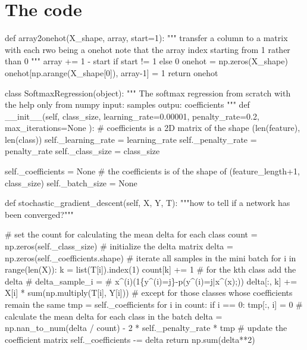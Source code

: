 \documentclass[a4paper]{article}
\begin{document}
\appendix
\section{The code}
\begin{python}

def array2onehot(X_shape, array, start=1):
    """
    transfer a column to a matrix with each rwo being a onehot
    note that the array index starting from 1 rather than 0
    """
    array += 1 - start if start != 1 else 0
    onehot = np.zeros(X_shape)
    onehot[np.arange(X_shape[0]), array-1] = 1
    return onehot


class SoftmaxRegression(object):
    """
    The softmax regression from scratch with the help only from numpy
    input:
        samples
    outpu:
        coefficients
    """
    def __init__(self,
                 class_size,
                 learning_rate=0.00001,
                 penalty_rate=0.2,
                 max_iterations=None
                 ):
        # coefficients is a 2D matrix of the shape (len(feature), len(class))
        self._learning_rate = learning_rate
        self._penalty_rate = penalty_rate
        self._class_size = class_size

        self._coefficients = None
				# the coefficients is of the shape of (feature_length+1, class_size)
        self._batch_size = None

    def stochastic_gradient_descent(self, X, Y, T):
        """how to tell if a network has been converged?"""

        # set the count for calculating the mean delta for each class
        count = np.zeros(self._class_size)
        # initialize the delta matrix
        delta = np.zeros(self._coefficients.shape)
        # iterate all samples in the mini batch
        for i in range(len(X)):
            k = list(T[i]).index(1)
            count[k] += 1
            # for the kth class add the delta
            # delta_{sample_i} =
            # x^{(i)}(1\{y^{(i)}=j\}-p(y^{(i)}=j|x^{(x)};\theta))
            delta[:, k] += X[i] * sum(np.multiply(T[i], Y[i]))
        # except for those classes whose coefficients remain the same
        tmp = self._coefficients
        for i in count:
            if i == 0:
                tmp[:, i] = 0
        # calculate the mean delta for each class in the batch
        delta = np.nan_to_num(delta / count) - 2 * self._penalty_rate * tmp
        # update the coefficient matrix
        self._coefficients -= delta
        return np.sum(delta**2)


\end{python}
\end{document}
